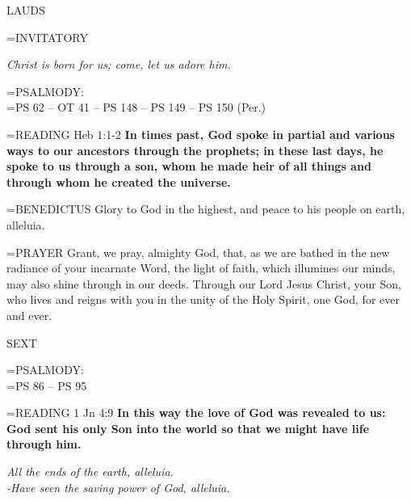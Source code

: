 \begin{flushleft}\normalsize LAUDS\\\end{flushleft}

\hangindent=\parindent \small{INVITATORY}
\begin{center}
\textit{Christ is born for us; come, let us adore him.\\}
\end{center}

\hangindent=\parindent \small{PSALMODY:}\\
\hangindent=\parindent  PS 62 -- OT 41 -- PS 148 -- PS 149 -- PS 150 (Per.) \vspace{0.5em}

\hangindent=\parindent \small{\uppercase{READING}}    Heb 1:1-2 \textbf{   In times past, God spoke in partial and various ways to our ancestors through the prophets; in these last days, he spoke to us through a son, whom he made heir of all things and through whom he created the universe.\\}

\hangindent=\parindent \small{BENEDICTUS 	Glory to God in the highest, and peace to his people on earth, alleluia.\\}

\hangindent=\parindent \small{PRAYER 	Grant, we pray, almighty God, that, as we are bathed in the new radiance of your incarnate Word, the light of faith, which illumines our minds, may also shine through in our deeds. Through our Lord Jesus Christ, your Son, who lives and reigns with you in the unity of the Holy Spirit, one God, for ever and ever.}

\begin{flushleft}\normalsize SEXT\\\end{flushleft}

\hangindent=\parindent \small{PSALMODY:}\\
\hangindent=\parindent  PS 86 -- PS 95\vspace{0.5em}

\hangindent=\parindent \small{\uppercase{READING}}    1 Jn 4:9 \textbf{    In this way the love of God was revealed to us: God sent his only Son into the world so that we might have life through him.\\}

\begin{center}
\textit{All the ends of the earth, alleluia.\\
-Have seen the saving power of God, alleluia.}
\end{center}

